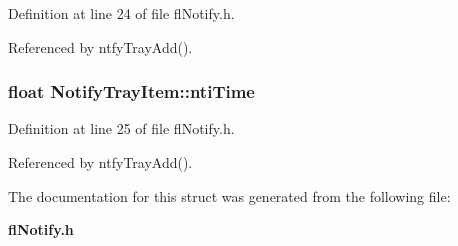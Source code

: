 Definition at line 24 of file fl\-Notify.h.

Referenced by ntfy\-Tray\-Add().
\subsubsection{\setlength{\rightskip}{0pt plus 5cm}float {\bf Notify\-Tray\-Item::nti\-Time}}\label{structNotifyTrayItem_384b7f807945d1f53f26b467334c5aea}




Definition at line 25 of file fl\-Notify.h.

Referenced by ntfy\-Tray\-Add().

The documentation for this struct was generated from the following file:\begin{CompactItemize}
\item 
{\bf fl\-Notify.h}\end{CompactItemize}
